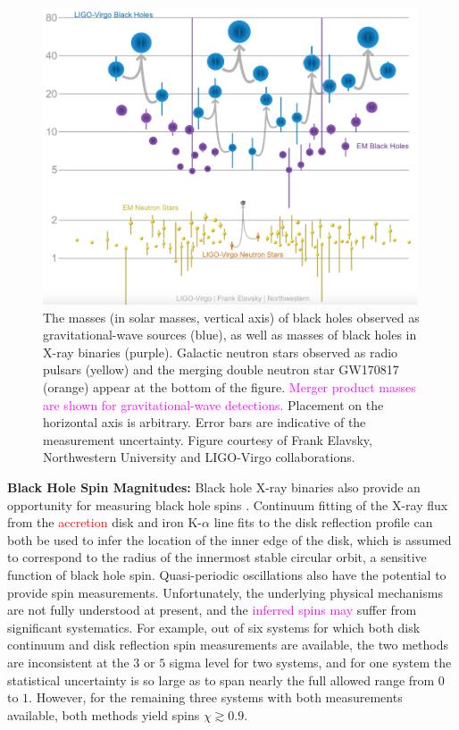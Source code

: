 \documentclass[iop,onecolumn]{revtex4}
\newcommand{\ajf}[1]{\textcolor{red}{#1}}
\newcommand{\ilya}[1]{\textcolor{magenta}{#1}}
\begin{document}
\begin{figure}
	\centering
	\includegraphics[width=0.99\textwidth]{Graveyard.png}%
	\caption{\label{fig:BHmasses}  The masses (in solar masses, vertical axis) of black holes observed as gravitational-wave sources (blue), as well as masses of black holes in X-ray binaries (purple).  Galactic neutron stars observed as radio pulsars (yellow) and the merging double neutron star GW170817 (orange) appear at the bottom of the figure.  \ilya{Merger product masses are shown for gravitational-wave detections.} Placement on the horizontal axis is arbitrary.  Error bars are indicative of the measurement uncertainty.  Figure courtesy of Frank Elavsky, Northwestern University and LIGO-Virgo collaborations.}
\end{figure}


\textbf{Black Hole Spin Magnitudes:} Black hole X-ray binaries also provide an opportunity for measuring black hole spins \citep[see][for a recent review]{MillerMiller:2015}.  Continuum fitting of the X-ray flux from the \ajf{accretion} disk and iron K-$\alpha$ line fits to the disk reflection profile can both be used to infer the location of the inner edge of the disk, which is assumed to correspond to the radius of the innermost stable circular orbit, a sensitive function of black hole spin.  Quasi-periodic oscillations also have the potential to provide spin measurements.  Unfortunately, the underlying physical mechanisms are not fully understood at present, and the \ilya{inferred spins may} suffer from significant systematics.  For example, out of six systems for which both disk continuum and disk reflection spin measurements are available, the two methods are inconsistent at the $3$ or $5$ sigma level for two systems, and for one system the statistical uncertainty is so large as to span nearly the full allowed range from $0$ to $1$.  However, for the remaining three systems with both measurements available, both methods yield spins $\chi \gtrsim 0.9$.  
\end{document}
